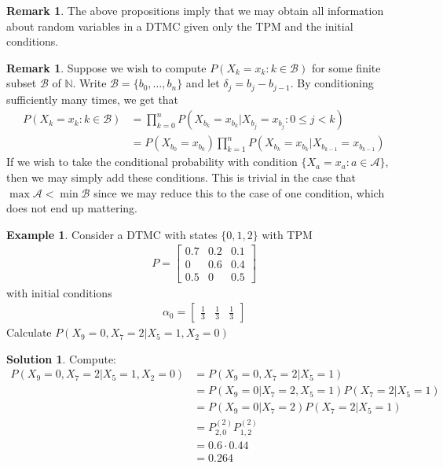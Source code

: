 \documentclass[11pt]{amsart}
\theoremstyle{definition}
\newtheorem{remark}[theorem]{Remark}
\newtheorem{example}[theorem]{Example}
\newtheorem{solution}[theorem]{Solution}
\numberwithin{equation}{section}
\begin{document}
 \begin{remark}
     The above propositions imply that we may obtain all information about random variables in a DTMC given only the TPM and the initial conditions.
 \end{remark}
 \begin{remark}
     Suppose we wish to compute $P(X_k=x_k:k\in\mathcal B)$ for some finite subset $\mathcal B$ of $\mathbb N$. Write $\mathcal B=\{b_0,\ldots,b_n\}$ and let $\delta_j=b_j-b_{j-1}$. By conditioning sufficiently many times, we get that
     \begin{align*}
         P(X_k=x_k:k\in\mathcal B)&=\prod_{k=0}^nP(X_{b_k}=x_{b_k}|X_{b_j}=x_{b_j}:0\le j<k)\\
         &=P(X_{b_0}=x_{b_0})\prod_{k=1}^nP(X_{b_k}=x_{b_k}|X_{b_{k-1}}=x_{b_{k-1}})
     \end{align*}
     If we wish to take the conditional probability with condition $\{X_{a}=x_{a}:a\in\mathcal A\}$, then we may simply add these conditions. This is trivial in the case that $\max\mathcal A<\min\mathcal B$ since we may reduce this to the case of one condition, which does not end up mattering.
 \end{remark}
 \begin{example}\label{DTMCex31}
     Consider a DTMC with states $\{0,1,2\}$ with TPM
     \begin{align*}
         P=\begin{bmatrix}
             0.7 & 0.2 & 0.1\\
             0 & 0.6 & 0.4\\
             0.5 & 0 & 0.5
         \end{bmatrix}
     \end{align*}
     with initial conditions
     \begin{align*}
         \alpha_0=\begin{bmatrix}
             \frac{1}{3} & \frac{1}{3} & \frac{1}{3}
         \end{bmatrix}
     \end{align*}
     Calculate $P(X_9=0,X_7=2|X_5=1,X_2=0)$
 \end{example}
 \addtocounter{theorem}{-1}
 \begin{solution}
     Compute:
     \begin{align*}
         P(X_9=0,X_7=2|X_5=1,X_2=0)&=P(X_9=0,X_7=2|X_5=1)\\
         &=P(X_9=0|X_7=2,X_5=1)P(X_7=2|X_5=1)\\
         &=P(X_9=0|X_7=2)P(X_7=2|X_5=1)\\
         &=P_{2,0}^{(2)}P_{1,2}^{(2)}\\
         &=0.6\cdot0.44\\
         &=0.264
     \end{align*}
 \end{solution}
\end{document}
